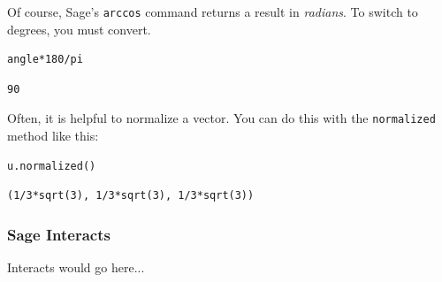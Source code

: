 \documentclass[10pt,]{book}
\theoremstyle{plain}
\numberwithin{equation}{section}
\begin{document}
      Of course, Sage's \verb?arccos? command returns a result in \emph{radians}.
      To switch to degrees, you must convert.
\begin{lstlisting}[style=sageinput]
angle*180/pi
\end{lstlisting}
\begin{lstlisting}[style=sageoutput]
90
\end{lstlisting}
\par
Often, it is helpful to normalize a vector. You can do this with the
      \verb?normalized? method like this:
\begin{lstlisting}[style=sageinput]
u.normalized()
\end{lstlisting}
\begin{lstlisting}[style=sageoutput]
(1/3*sqrt(3), 1/3*sqrt(3), 1/3*sqrt(3))
\end{lstlisting}
\typeout{************************************************}
\typeout{************************************************}
\subsubsection[Sage Interacts]{Sage Interacts}\label{subsubsection-3}
Interacts would go here...%
\typeout{************************************************}
\typeout{************************************************}
\end{document}
